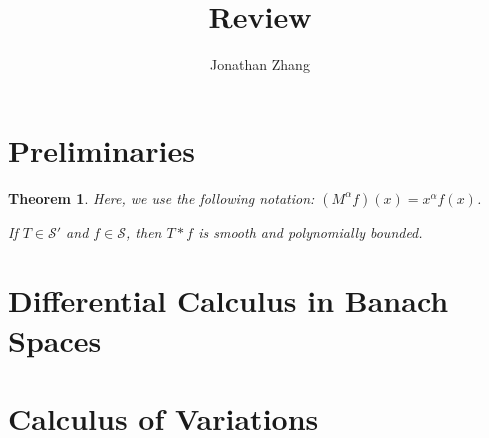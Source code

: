 \documentclass[letterpaper,twoside,12pt]{article}
\theoremstyle{mystyle}
\newtheorem{theorem}{Theorem}[section]
\newcommand{\ScS}{\mathcal S}
\begin{document}
\title{\vspace{-2\baselineskip} 
Review
}
\author{Jonathan Zhang}
\date{}
\maketitle


\section{Preliminaries}

\begin{tcolorbox}[colback=red!5!white,colframe=red!75!black]
  \begin{theorem}
    Here, we use the following notation: $\left( {{M^\alpha }f} \right)\left( x \right) = {x^\alpha }f\left( x \right)$.
    
    If $T\in \ScS'$ and $f \in \ScS$, then $T\ast f$ is smooth and polynomially bounded. 
  \end{theorem}
  \end{tcolorbox}
  
  






\newpage\section{Differential Calculus in Banach Spaces}
\newpage\section{Calculus of Variations }
\end{document}
